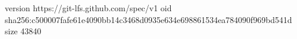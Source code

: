 version https://git-lfs.github.com/spec/v1
oid sha256:c500007fafe61e4090bb14c3468d0935e634e698861534ea784090f969bd541d
size 43840

